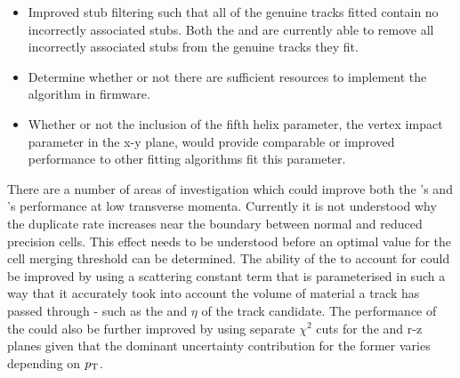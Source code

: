 \begin{itemize}
\item Improved stub filtering such that all of the genuine tracks fitted contain no incorrectly associated stubs. Both the \KF and \LR are currently able to remove all incorrectly associated stubs from the genuine tracks they fit. 
\item Determine whether or not there are sufficient resources to implement the algorithm in firmware.
\item Whether or not the inclusion of the fifth helix parameter, the vertex impact parameter in the x-y plane, would provide comparable or improved performance to other fitting algorithms fit this parameter.
\end{itemize}

There are a number of areas of investigation which could improve both the \HT's and \KF's performance at low  transverse momenta.
Currently it is not understood why the duplicate rate increases near the boundary between normal and reduced precision \HT cells.
This effect needs to be understood before an optimal value for the cell merging threshold can be determined.
The ability of the \KF to account for \MS could be improved by using a scattering constant term that is parameterised in such a way that it accurately took into account the volume of material a track has passed through - such as the \pt and $\eta$ of the track candidate.
The performance of the \KF could also be further improved by using separate \KF $\chi^{2}$ cuts for the \rphi and r-z planes given that the dominant uncertainty contribution for the former varies depending on $p_{\mathrm{T}}$.